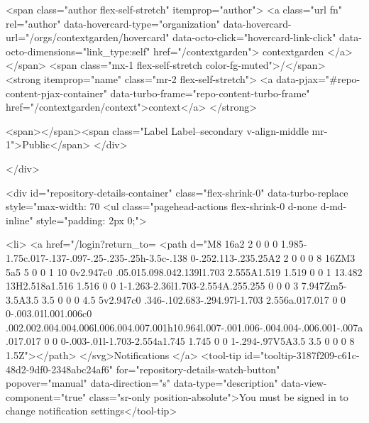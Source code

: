     <span class="author flex-self-stretch" itemprop="author">
      <a class="url fn" rel="author" data-hovercard-type="organization" data-hovercard-url="/orgs/contextgarden/hovercard" data-octo-click="hovercard-link-click" data-octo-dimensions="link_type:self" href="/contextgarden">
        contextgarden
</a>    </span>
    <span class="mx-1 flex-self-stretch color-fg-muted">/</span>
    <strong itemprop="name" class="mr-2 flex-self-stretch">
      <a data-pjax="#repo-content-pjax-container" data-turbo-frame="repo-content-turbo-frame" href="/contextgarden/context">context</a>
    </strong>

    <span></span><span class="Label Label--secondary v-align-middle mr-1">Public</span>
  </div>


        </div>

        <div id="repository-details-container" class="flex-shrink-0" data-turbo-replace style="max-width: 70%
            <ul class="pagehead-actions flex-shrink-0 d-none d-md-inline" style="padding: 2px 0;">
    
      

  <li>
            <a href="/login?return_to=%
    <path d="M8 16a2 2 0 0 0 1.985-1.75c.017-.137-.097-.25-.235-.25h-3.5c-.138 0-.252.113-.235.25A2 2 0 0 0 8 16ZM3 5a5 5 0 0 1 10 0v2.947c0 .05.015.098.042.139l1.703 2.555A1.519 1.519 0 0 1 13.482 13H2.518a1.516 1.516 0 0 1-1.263-2.36l1.703-2.554A.255.255 0 0 0 3 7.947Zm5-3.5A3.5 3.5 0 0 0 4.5 5v2.947c0 .346-.102.683-.294.97l-1.703 2.556a.017.017 0 0 0-.003.01l.001.006c0 .002.002.004.004.006l.006.004.007.001h10.964l.007-.001.006-.004.004-.006.001-.007a.017.017 0 0 0-.003-.01l-1.703-2.554a1.745 1.745 0 0 1-.294-.97V5A3.5 3.5 0 0 0 8 1.5Z"></path>
</svg>Notifications
</a>    <tool-tip id="tooltip-3187f209-c61c-48d2-9df0-2348abc24af6" for="repository-details-watch-button" popover="manual" data-direction="s" data-type="description" data-view-component="true" class="sr-only position-absolute">You must be signed in to change notification settings</tool-tip>

